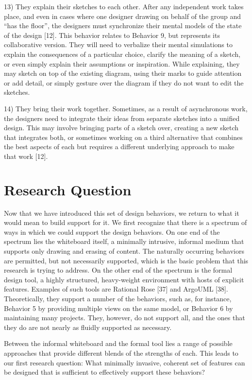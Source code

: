 13)	They explain their sketches to each other. After any independent work takes place, and even in cases where one designer drawing on behalf of the group and “has the floor”, the designers must synchronize their mental models of the state of the design [12]. This behavior relates to Behavior 9, but represents its collaborative version. They will need to verbalize their mental simulations to explain the consequences of a particular choice, clarify the meaning of a sketch, or even simply explain their assumptions or inspiration. While explaining, they may sketch on top of the existing diagram, using their marks to guide attention or add detail, or simply gesture over the diagram if they do not want to edit the sketches.

14)	They bring their work together.  Sometimes, as a result of asynchronous work, the designers need to integrate their ideas from separate sketches into a unified design. This may involve bringing parts of a sketch over, creating a new sketch that integrates both, or sometimes working on a third alternative that combines the best aspects of each but requires a different underlying approach to make that work [12].

\section{Research Question}

Now that we have introduced this set of design behaviors, we return to what it would mean to build support for it. We first recognize that there is a spectrum of ways in which we could support the design behaviors. On one end of the spectrum lies the whiteboard itself, a minimally intrusive, informal medium that supports only drawing and erasing of content. The naturally occurring behaviors are permitted, but not necessarily supported, which is the basic problem that this research is trying to address. On the other end of the spectrum is the formal design tool, a highly structured, heavy-weight environment with hosts of explicit features. Examples of such tools are Rational Rose [37] and ArgoUML [38]. Theoretically, they support a number of the behaviors, such as, for instance, Behavior 5 by providing multiple views on the same model, or Behavior 6 by maintaining many projects. They, however, do not support all, and the ones that they do are not nearly as fluidly supported as necessary. 

Between the informal whiteboard and the formal tool lies a range of possible approaches that provide different blends of the strengths of each. This leads to our first research question:
What minimally invasive, coherent set of features can be designed that is sufficient to effectively support these behaviors? 

